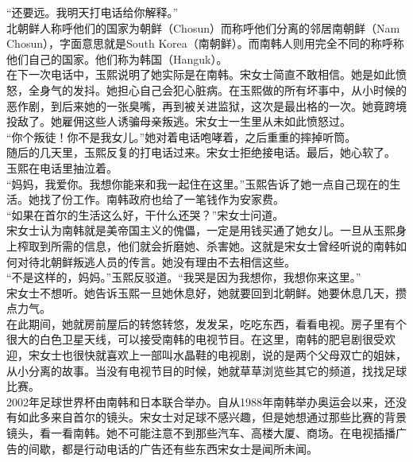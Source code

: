 “还要远。我明天打电话给你解释。”\\

北朝鲜人称呼他们的国家为朝鲜（Chosun）而称呼他们分离的邻居南朝鲜（Nam Chosun），字面意思就是South Korea（南朝鲜）。而南韩人则用完全不同的称呼称他们自己的国家。他们称为韩国（Hanguk）。\\

在下一次电话中，玉熙说明了她实际是在南韩。宋女士简直不敢相信。她是如此愤怒，全身气的发抖。她担心自己会犯心脏病。在玉熙做的所有坏事中，从小时候的恶作剧，到后来她的一张臭嘴，再到被关进监狱，这次是最出格的一次。她竟跨境投敌了。她雇佣这些人诱骗母亲叛逃。宋女士一生里从未如此愤怒过。\\

“你个叛徒！你不是我女儿。”她对着电话咆哮着，之后重重的摔掉听筒。\\

随后的几天里，玉熙反复的打电话过来。宋女士拒绝接电话。最后，她心软了。\\

玉熙在电话里抽泣着。\\

“妈妈，我爱你。我想你能来和我一起住在这里。”玉熙告诉了她一点自己现在的生活。她找了份工作。南韩政府也给了一笔钱作为安家费。\\

“如果在首尔的生活这么好，干什么还哭？”宋女士问道。\\

宋女士认为南韩就是美帝国主义的傀儡，一定是用钱买通了她女儿。一旦从玉熙身上榨取到所需的信息，他们就会折磨她、杀害她。这就是宋女士曾经听说的南韩如何对待北朝鲜叛逃人员的传言。她没有理由不去相信这些。\\

“不是这样的，妈妈。”玉熙反驳道。“我哭是因为我想你，我想你来这里。”\\

宋女士不想听。她告诉玉熙一旦她休息好，她就要回到北朝鲜。她要休息几天，攒点力气。\\

在此期间，她就房前屋后的转悠转悠，发发呆，吃吃东西，看看电视。房子里有个很大的白色卫星天线，可以接受南韩的电视节目。在这里，南韩的肥皂剧很受欢迎，宋女士也很快就喜欢上一部叫水晶鞋的电视剧，说的是两个父母双亡的姐妹，从小分离的故事。当没有电视节目的时候，她就草草浏览些其它的频道，找找足球比赛。\\

2002年足球世界杯由南韩和日本联合举办。自从1988年南韩举办奥运会以来，还没有如此多来自首尔的镜头。宋女士对足球不感兴趣，但是她想通过那些比赛的背景镜头，看一看南韩。她不可能注意不到那些汽车、高楼大厦、商场。在电视插播广告的间歇，都是行动电话的广告还有些东西宋女士是闻所未闻。\\

